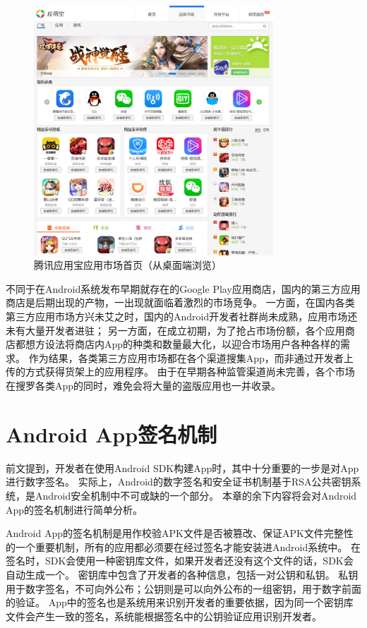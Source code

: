 \begin{figure}[htbp]
	\centering
	\includegraphics[width=0.8\textwidth]{./Figures/edwin-yyb.jpg}
	\caption{腾讯应用宝应用市场首页（从桌面端浏览）}
	\label{fig:mkt-yyb}
	\vspace{-5mm}
\end{figure}

不同于在Android系统发布早期就存在的Google Play应用商店，国内的第三方应用商店是后期出现的产物，一出现就面临着激烈的市场竞争。
一方面，在国内各类第三方应用市场方兴未艾之时，国内的Android开发者社群尚未成熟，应用市场还未有大量开发者进驻；
另一方面，在成立初期，为了抢占市场份额，各个应用商店都想方设法将商店内App的种类和数量最大化，以迎合市场用户各种各样的需求。
作为结果，各类第三方应用市场都在各个渠道搜集App，而非通过开发者上传的方式获得货架上的应用程序。
由于在早期各种监管渠道尚未完善，各个市场在搜罗各类App的同时，难免会将大量的盗版应用也一并收录。

\section{Android App签名机制}

前文提到，开发者在使用Android SDK构建App时，其中十分重要的一步是对App进行数字签名。
实际上，Android的数字签名和安全证书机制基于RSA公共密钥系统，是Android安全机制中不可或缺的一个部分。
本章的余下内容将会对Android App的签名机制进行简单分析。

Android App的签名机制是用作校验APK文件是否被篡改、保证APK文件完整性的一个重要机制，所有的应用都必须要在经过签名才能安装进Android系统中。
在签名时，SDK会使用一种密钥库文件，如果开发者还没有这个文件的话，SDK会自动生成一个。
密钥库中包含了开发者的各种信息，包括一对公钥和私钥。
私钥用于数字签名，不可向外公布；公钥则是可以向外公布的一组密钥，用于数字前面的验证。
App中的签名也是系统用来识别开发者的重要依据，因为同一个密钥库文件会产生一致的签名，系统能根据签名中的公钥验证应用识别开发者。

